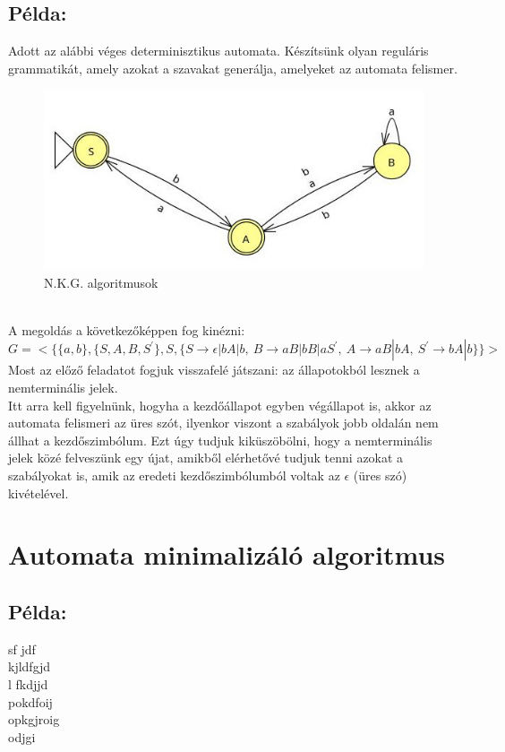 \documentclass[12pt]{article}
\begin{document}
\subsection{Példa:}
Adott az alábbi véges determinisztikus automata. Készítsünk olyan reguláris grammatikát, amely azokat a szavakat
generálja, amelyeket az automata felismer.
\begin{figure}[h]
  \centering
  \includegraphics[width=0.7\linewidth]{img/a_to_g.jpg} 
  \caption{N.K.G. algoritmusok}
  \label{fig:your_label}
\end{figure}\\
A megoldás a következőképpen fog kinézni:
$$ G=<\{ \{a,b\}, \{S,A,B,S^{'} \}, S,
\{ S \rightarrow \epsilon|bA|b, \ B \rightarrow aB|bB|aS^{'}, \ A \rightarrow aB|bA, \ S^{'} \rightarrow bA|b \} 
\}> $$
Most az előző feladatot fogjuk visszafelé játszani: az állapotokból lesznek a nemterminális jelek.
\\
Itt arra kell figyelnünk, hogyha a kezdőállapot egyben végállapot is, akkor az automata felismeri az üres szót,
ilyenkor viszont a szabályok jobb oldalán nem állhat a kezdőszimbólum. Ezt úgy tudjuk kiküszöbölni, hogy
a nemterminális jelek közé felveszünk egy újat, amikből elérhetővé tudjuk tenni azokat a szabályokat is, amik
az eredeti kezdőszimbólumból voltak az $\epsilon$ (üres szó) kivételével.

\section{Automata minimalizáló algoritmus}
\subsection{Példa:}
sf jdf\\kjldfgjd\\l fkdjjd\\pokdfoij\\opkgjroig\\odjgi
\end{document}
